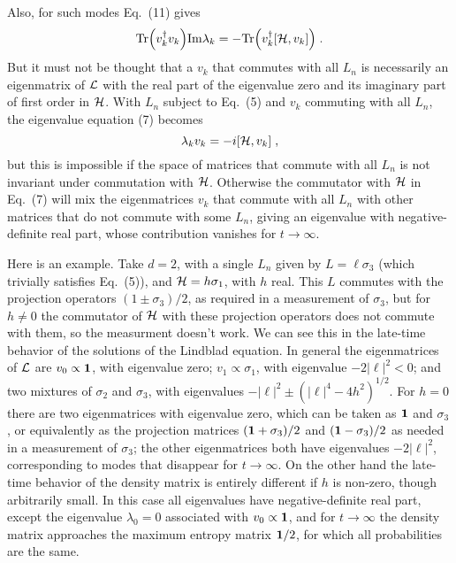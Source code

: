 \documentclass[12pt]{article}
\def\BM#1{\mbox{\boldmath{$#1$}}}
\begin{document}
Also, for such modes Eq.~(11) gives
\begin{equation}{\rm Tr}\Big(v_k^\dagger v_k\Big){\rm Im}\lambda_k=-{\rm Tr}\Big(v_k^\dagger [{\cal H},v_k]\Big)\;.
\end{equation}
But it must not be thought that a $v_k$ that commutes with all $L_n$ is necessarily an eigenmatrix of ${\cal L}$ with the real part of the eigenvalue zero and its imaginary part of first order in ${\cal H}$.    With $L_n$ subject to Eq.~(5) and $v_k$ commuting with all $L_n$, the eigenvalue equation (7) becomes
$$\lambda_k v_k=-i[{\cal H},v_k]\;,$$
but this is impossible if the space of matrices that commute with all $L_n$ is not invariant under commutation with ${\cal H}$.  Otherwise the commutator with ${\cal H}$ in Eq.~(7) will mix the eigenmatrices $v_k$ that commute with all $L_n$ with other matrices that do not commute with some ${L_n}$, giving an eigenvalue with negative-definite real part, whose contribution vanishes for $t\rightarrow\infty$.  

Here is an example. Take $d=2$, with a single $L_n$ given by $L=\ell\sigma_3$ (which trivially satisfies Eq.~(5)), and ${\cal H}=h\sigma_1$, with $h$ real.  This $L$ commutes with the projection operators $(1\pm \sigma_3)/2$, as required in a measurement of $\sigma_3$, but for $h\neq 0$ the commutator of ${\cal H}$ with these projection operators does not commute with them, so the measurment doesn't work.  We can see this in the late-time behavior of the solutions of the Lindblad equation.   In general the eigenmatrices  of ${\cal L}$ are $v_0\propto\BM{1}$, with eigenvalue zero; $v_{1}\propto\sigma_1$, with eigenvalue $-2|\ell|^2<0$; and two mixtures of $\sigma_2$ and $\sigma_3$, with eigenvalues $-|\ell|^2\pm(|\ell|^4-4h^2)^{1/2}$.  For $h=0$ there are two eigenmatrices with eigenvalue zero, which can be taken as $\BM{1}$ and $\sigma_3$, or equivalently as the projection matrices $(\BM{1}+\sigma_3)/2$ and       $(\BM{1}-\sigma_3)/2$ as needed in a measurement of $\sigma_3$; the other eigenmatrices both have eigenvalues $-2|\ell|^2$, corresponding to modes that disappear for $t\rightarrow \infty$.  On the other hand the late-time behavior of the density matrix is entirely different if $h$ is non-zero, though arbitrarily small.  In this case all eigenvalues have negative-definite real part, except the eigenvalue $\lambda_0=0$ associated with $v_0\propto\BM{1}$, and  for $t\rightarrow \infty$ the density matrix approaches the maximum entropy matrix $\BM{1}/2$, for which all probabilities are the same.   
\end{document}
